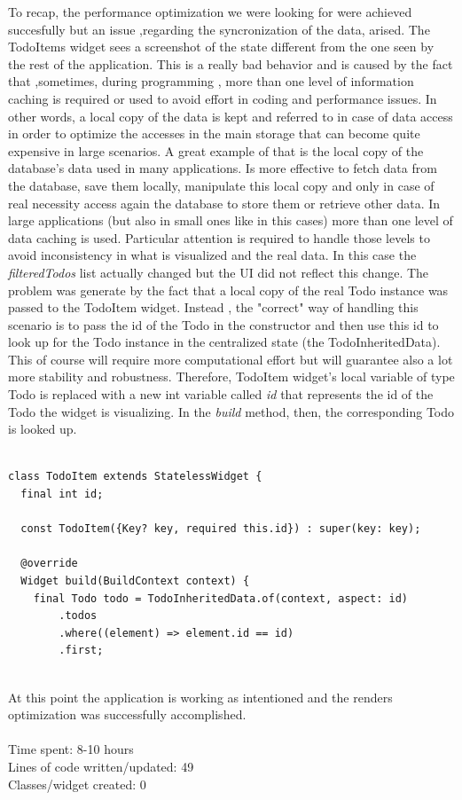 To recap, the performance optimization we were looking for were achieved succesfully but an issue ,regarding the syncronization of the data, arised. The TodoItems widget sees a screenshot of the state different from the one seen by the rest of the application. This is a really bad behavior and is caused by the fact that ,sometimes, during programming , more than one level of information caching is required or used to avoid effort in coding and performance issues. In other words, a local copy of the data is kept and referred to in case of data access in order to optimize the accesses in the main storage that can become quite expensive in large scenarios. A great example of that is the local copy of the database’s data used in many applications. Is more effective to fetch data from the database, save them locally, manipulate this local copy and only in case of real necessity access again the database to store them or retrieve other data. In large applications (but also in small ones like in this cases) more than one level of data caching is used. Particular attention is required to handle those levels to avoid inconsistency in what is visualized and the real data. In this case the \textit{filteredTodos} list actually changed but the UI did not reflect this change. The problem was generate by the fact that a local copy of the real Todo instance was passed to the TodoItem widget. Instead , the "correct" way of handling this scenario is to pass the id of the Todo in the constructor and then use this id to look up for the Todo instance in the centralized state (the TodoInheritedData). This of course will require more computational effort but  will guarantee also a lot more stability and robustness. 
Therefore, TodoItem widget's local variable of type Todo is replaced with a new int variable called \textit{id} that represents the id of the Todo the widget is visualizing. In the \textit{build} method, then, the corresponding Todo is looked up.
\mbox{}\\
\begin{code}
\mbox{}
\label{code:2.48}
\begin{verbatim}

class TodoItem extends StatelessWidget {
  final int id;

  const TodoItem({Key? key, required this.id}) : super(key: key);

  @override
  Widget build(BuildContext context) {
    final Todo todo = TodoInheritedData.of(context, aspect: id)
        .todos
        .where((element) => element.id == id)
        .first;
\end{verbatim}
\end{code}
\mbox{}\\
At this point the application is working as intentioned and the renders optimization was successfully accomplished. \\
\\
Time spent: 8-10 hours\\
Lines of code written/updated: 49\\ 
Classes/widget created: 0 \\






